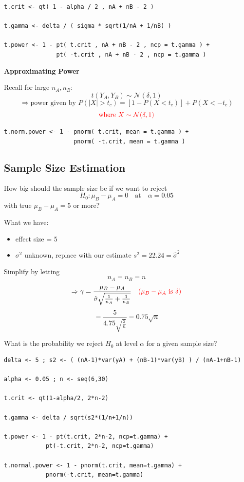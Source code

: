 \documentclass[14pt]{extarticle}
\begin{document}
\begin{lstlisting}
t.crit <- qt( 1 - alpha / 2 , nA + nB - 2 )

t.gamma <- delta / ( sigma * sqrt(1/nA + 1/nB) )

t.power <- 1 - pt( t.crit , nA + nB - 2 , ncp = t.gamma ) +
               pt( -t.crit , nA + nB - 2 , ncp = t.gamma )
\end{lstlisting}

\noindent \textbf{Approximating Power}

\noindent Recall for large \(n_A, n_B\):
\[
t(Y_A, Y_B) \sim \mathcal{N}(\delta, 1)
\]
\[
\Rightarrow \text{power given by } P(|X| > t_c) = [1 - P(X < t_c)] + P(X < -t_c)
\]
\[\textcolor{red}{\text{where } X \sim \mathcal{N}(\delta, 1)}
\]

\begin{lstlisting}
t.norm.power <- 1 - pnorm( t.crit, mean = t.gamma ) + 
                    pnorm( -t.crit, mean = t.gamma )
\end{lstlisting}
    
\subsection*{Sample Size Estimation}
How big should the sample size be if we want to reject
\[
H_0: \mu_B - \mu_A = 0 \quad \text{at} \quad \alpha = 0.05
\]
with true \(\mu_B - \mu_A = 5\) or more?
\vspace{0.5cm}

What we have:
\begin{itemize}
    \item effect size = 5
    \item \(\sigma^2\) unknown, replace with our estimate \(s^2 = 22.24 = \hat\sigma^2\)
\end{itemize}

\noindent Simplify by letting 
\[n_A = n_B = n\]
\[
\Rightarrow \gamma = \frac{\mu_B - \mu_A}{\hat{\sigma} \sqrt{\frac{1}{n_A} + \frac{1}{n_B}}}
\textcolor{red}{\quad (\mu_B - \mu_A \text{ is } \delta )}
\]
\[
= \frac{5}{4.75 \sqrt{\frac{2}{n}}} = 0.75 \sqrt{n}
\]

\noindent What is the probability we reject $H_0$ at level $\alpha$ for a given sample size? \\

\begin{lstlisting}
delta <- 5 ; s2 <- ( (nA-1)*var(yA) + (nB-1)*var(yB) ) / (nA-1+nB-1)

alpha <- 0.05 ; n <- seq(6,30)
    
t.crit <- qt(1-alpha/2, 2*n-2)
    
t.gamma <- delta / sqrt(s2*(1/n+1/n))
    
t.power <- 1 - pt(t.crit, 2*n-2, ncp=t.gamma) + 
            pt(-t.crit, 2*n-2, ncp=t.gamma)

t.normal.power <- 1 - pnorm(t.crit, mean=t.gamma) + 
            pnorm(-t.crit, mean=t.gamma)
\end{lstlisting}
    
\end{document}
